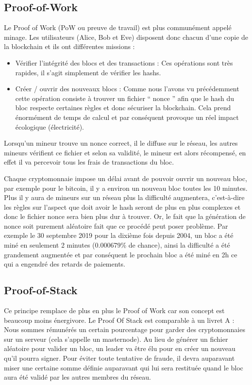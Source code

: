 \documentclass[12pt, a4paper, oneside]{book}
\begin{document}
    \subsection{Proof-of-Work}

    Le Proof of Work (PoW ou preuve de travail) est plus communément appelé minage. Les utilisateurs (Alice, Bob et Eve) disposent donc chacun d’une copie de la blockchain et ils ont différentes missions :

    \begin{itemize}
        \item Vérifier l’intégrité des blocs et des transactions : Ces opérations sont très rapides, il s’agit simplement de vérifier les hashs.
        \item Créer / ouvrir des nouveaux blocs : Comme nous l’avons vu précédemment cette opération consiste à trouver un fichier \hyphenquote{french}{ nonce } afin que le hash du bloc respecte certaines règles et donc sécuriser la blockchain. Cela prend énormément de temps de calcul et par conséquent provoque un réel impact écologique (électricité).
        \newline
    \end{itemize}

    Lorsqu’un mineur trouve un nonce correct, il le diffuse sur le réseau, les autres mineurs vérifient ce fichier et selon sa validité, le mineur est alors récompensé, en effet il va percevoir tous les frais de transactions du bloc.
    \newline

    Chaque cryptomonnaie impose un délai avant de pouvoir ouvrir un nouveau bloc, par exemple pour le bitcoin, il y a environ un nouveau bloc toutes les 10 minutes.
    Plus il y aura de mineurs sur un réseau plus la difficulté augmentera, c'est-à-dire les règles sur l'aspect que doit avoir le hash seront de plus en plus complexes et donc le fichier nonce sera bien plus dur à trouver. \newline
    Or, le fait que la génération de nonce soit purement aléatoire fait que ce procédé peut poser problème. Par exemple le 30 septembre 2019 pour la dixième fois depuis 2004, un bloc a été miné en seulement 2 minutes (0.000679\% de chance),
    ainsi la difficulté a été grandement augmentée et par conséquent le prochain bloc a été miné en 2h ce qui a engendré des retards de paiements.

    \subsection{Proof-of-Stack}
    Ce principe remplace de plus en plus le Proof of Work car son concept est beaucoup moins énergivore. Le Proof Of Stack est comparable à un livret A : Nous sommes rémunérés un certain pourcentage pour garder des cryptomonnaies sur un serveur (cela s’appelle un masternode).
    Au lieu de générer un fichier aléatoire pour valider un bloc, un leader va être élu pour en créer un nouveau qu’il pourra signer. Pour éviter toute tentative de fraude, il devra auparavant miser une certaine somme définie auparavant qui lui sera restituée quand le bloc aura été validé par les autres membres du réseau.
\end{document}
